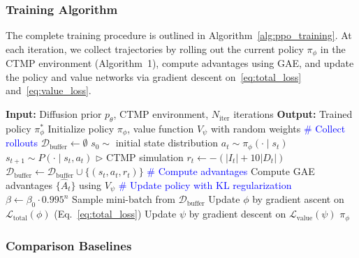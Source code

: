 \subsubsection{Training Algorithm}

The complete training procedure is outlined in Algorithm~\ref{alg:ppo_training}.
At each iteration, we collect trajectories by rolling out the current policy
$\pi_\phi$ in the CTMP environment (Algorithm~1), compute advantages using GAE,
and update the policy and value networks via gradient descent on~\eqref{eq:total_loss}
and~\eqref{eq:value_loss}.

\begin{algorithm}[t]
\caption{Prior-Guided PPO Training}
\label{alg:ppo_training}
\begin{algorithmic}[1]
\STATE \textbf{Input:} Diffusion prior $p_\theta$, CTMP environment, $N_{\text{iter}}$ iterations
\STATE \textbf{Output:} Trained policy $\pi_\phi^*$
\STATE
\STATE Initialize policy $\pi_\phi$, value function $V_\psi$ with random weights
    \STATE \textcolor{blue}{\# Collect rollouts}
    \STATE $\mathcal{D}_{\text{buffer}} \gets \emptyset$
        \STATE $s_0 \sim$ initial state distribution
            \STATE $a_t \sim \pi_\phi(\cdot \mid s_t)$
            \STATE $s_{t+1} \sim P(\cdot \mid s_t, a_t)$ \hfill $\triangleright$ CTMP simulation
            \STATE $r_t \gets -(|I_t| + 10|D_t|)$
            \STATE $\mathcal{D}_{\text{buffer}} \gets \mathcal{D}_{\text{buffer}} \cup \{(s_t, a_t, r_t)\}$
        \ENDFOR
    \ENDFOR
    \STATE
    \STATE \textcolor{blue}{\# Compute advantages}
    \STATE Compute GAE advantages $\{\hat{A}_t\}$ using $V_\psi$
    \STATE
    \STATE \textcolor{blue}{\# Update policy with KL regularization}
    \STATE $\beta \gets \beta_0 \cdot 0.995^n$
        \STATE Sample mini-batch from $\mathcal{D}_{\text{buffer}}$
        \STATE Update $\phi$ by gradient ascent on $\mathcal{L}_{\text{total}}(\phi)$ (Eq.~\ref{eq:total_loss})
        \STATE Update $\psi$ by gradient descent on $\mathcal{L}_{\text{value}}(\psi)$
    \ENDFOR
\ENDFOR
\RETURN $\pi_\phi$
\end{algorithmic}
\end{algorithm}

\subsubsection{Comparison Baselines}

